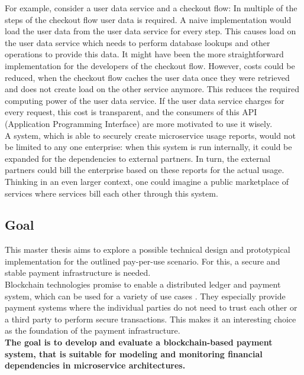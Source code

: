 \documentclass[a4paper,12pt]{scrartcl}
\begin{document}
For example, consider a user data service and a checkout flow: In multiple of the steps of the checkout flow user data is required. A naive implementation would load the user data from the user data service for every step. This causes load on the user data service which needs to perform database lookups and other operations to provide this data. It might have been the more straightforward implementation for the developers of the checkout flow. However, costs could be reduced, when the checkout flow caches the user data once they were retrieved and does not create load on the other service anymore. This reduces the required computing power of the user data service. If the user data service charges for every request, this cost is transparent, and the consumers of this API (Application Programming Interface) are more motivated to use it wisely.\\

A system, which is able to securely create microservice usage reports, would not be limited to any one enterprise: when this system is run internally, it could be expanded for the dependencies to external partners. In turn, the external partners could bill the enterprise based on these reports for the actual usage.\\

Thinking in an even larger context, one could imagine a public marketplace of services where services bill each other through this system.

\subsection{Goal}

This master thesis aims to explore a possible technical design and prototypical implementation for the outlined pay-per-use scenario. For this, a secure and stable payment infrastructure is needed.\\

Blockchain technologies promise to enable a distributed ledger and payment system, which can be used for a variety of use cases \cite{web5}. They especially provide payment systems where the individual parties do not need to trust each other or a third party to perform secure transactions. This makes it an interesting choice as the foundation of the payment infrastructure.\\

\textbf{The goal is to develop and evaluate a blockchain-based payment system, that is suitable for modeling and monitoring financial dependencies in microservice architectures.}\\
\end{document}
